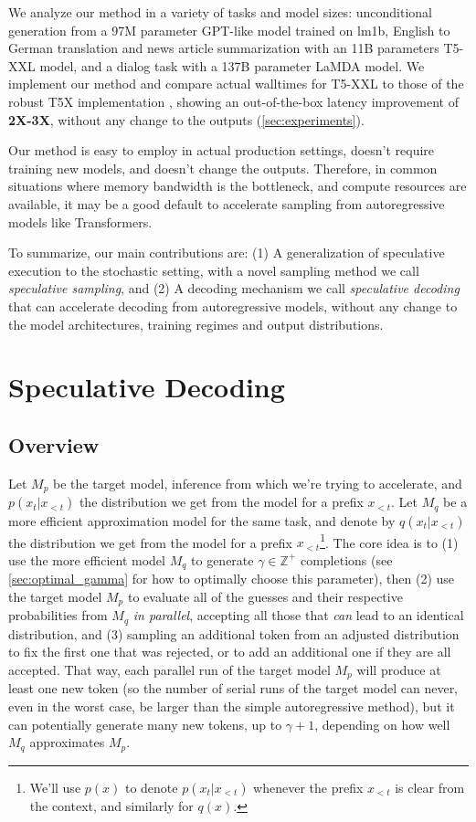 \documentclass[nohyperref]{article}
\theoremstyle{plain}
\theoremstyle{definition}
\theoremstyle{remark}
\begin{document}
We analyze our method in a variety of tasks and model sizes: unconditional generation from a 97M parameter GPT-like model trained on lm1b, English to German translation and news article summarization with an 11B parameters T5-XXL model, and a dialog task with a 137B parameter LaMDA model. We implement our method and compare actual walltimes for T5-XXL to those of the robust T5X implementation \cite{t5x}, showing an out-of-the-box latency improvement of \textbf{2X-3X}, without any change to the outputs (\cref{sec:experiments}).

Our method is easy to employ in actual production settings, doesn't require training new models, and doesn't change the outputs.
Therefore, in common situations where memory bandwidth is the bottleneck, and  compute resources are available, it may be a good default to accelerate sampling from autoregressive models like Transformers.

To summarize, our main contributions are: (1) A generalization of speculative execution to the stochastic setting, with a novel sampling method we call \emph{speculative sampling}, and (2) A decoding mechanism we call \emph{speculative decoding} that can accelerate decoding from autoregressive models, without any change to the model architectures, training regimes and output distributions.

\section{Speculative Decoding}
\subsection{Overview}

Let $M_p$ be the target model, inference from which we're trying to accelerate, and $p(x_t|x_{<t})$ the distribution we get from the model for a prefix $x_{<t}$. Let $M_q$ be a more efficient approximation model for the same task, and denote by $q(x_t|x_{<t})$ the distribution we get from the model for a prefix $x_{<t}$\footnote{
We'll use $p(x)$ to denote $p(x_t|x_{<t})$ whenever the prefix $x_{<t}$ is clear from the context, and similarly for $q(x)$.}. The core idea is to (1) use the more efficient model $M_q$ to generate $\gamma \in \mathbb{Z}^+$ completions (see \cref{sec:optimal_gamma} for how to optimally choose this parameter), then (2) use the target model $M_p$ to evaluate all of the guesses and their respective probabilities from $M_q$ \emph{in parallel}, accepting all those that \emph{can} lead to an identical distribution, and (3) sampling an additional token from an adjusted distribution to fix the first one that was rejected, or to add an additional one if they are all accepted. That way, each parallel run of the target model $M_p$ will produce at least one new token (so the number of serial runs of the target model can never, even in the worst case, be larger than the simple autoregressive method), but it can potentially generate many new tokens, up to $\gamma + 1$, depending on how well $M_q$ approximates $M_p$.
\end{document}
